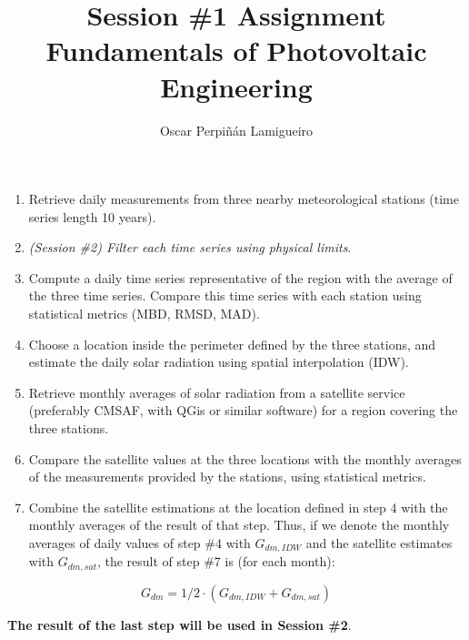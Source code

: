 \documentclass[11pt]{article}
\author{Oscar Perpiñán Lamigueiro}
\date{}
\title{Session \#1 Assignment\\\medskip
\large Fundamentals of Photovoltaic Engineering}
\begin{document}
\maketitle
\begin{enumerate}
\item Retrieve daily measurements from three nearby meteorological stations (time series length 10 years).
\item \emph{(Session \#2) Filter each time series using physical limits}.
\item Compute a daily time series representative of the region with the average of the three time series. Compare this time series with each station using statistical metrics (MBD, RMSD, MAD).
\item Choose a location inside the perimeter defined by the three stations, and estimate the daily solar radiation using spatial interpolation (IDW).
\item Retrieve monthly averages of solar radiation from a satellite service (preferably CMSAF, with QGis or similar software) for a region covering the three stations.
\item Compare the satellite values at the three locations with the monthly averages of the measurements provided by the stations, using statistical metrics.
\item Combine the satellite estimations at the location defined in step 4 with the monthly averages of the result of that step. Thus, if we denote the monthly averages of daily values of step \#4 with \(G_{dm,IDW}\) and the satellite estimates with \(G_{dm,sat}\), the result of step \#7 is (for each month):
\end{enumerate}
\[G_{dm} = 1/2 \cdot (G_{dm,IDW} + G_{dm,sat})\]

\textbf{The result of the last step will be used in Session \#2}.
\end{document}
